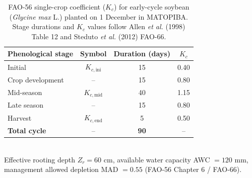 \begin{table}[!ht]
\centering
\caption{FAO-56 single-crop coefficient (\(K_c\)) for early-cycle soybean
(\textit{Glycine max} L.) planted on 1 December in MATOPIBA. Stage durations
and \(K_c\) values follow Allen \textit{et al.} (1998) Table 12 and Steduto
\textit{et al.} (2012) FAO-66.}
\label{tab:kc_soybean}
\begin{tabular}{lccc}
\toprule
\textbf{Phenological stage} & \textbf{Symbol} & \textbf{Duration (days)} & \textbf{\(K_c\)} \\
\midrule
Initial          & \(K_{c,\text{ini}}\) & 15 & 0.40 \\
Crop development & --                   & 15 & 0.80 \\
Mid-season       & \(K_{c,\text{mid}}\) & 40 & 1.15 \\
Late season      & --                   & 15 & 0.80 \\
Harvest          & \(K_{c,\text{end}}\) &  5 & 0.50 \\
\midrule
\textbf{Total cycle} & -- & \textbf{90} & -- \\
\bottomrule
\end{tabular}
\vspace{0.4em}\\
\footnotesize{Effective rooting depth \(Z_r = 60\) cm, available water
capacity AWC \(= 120\) mm, management allowed depletion MAD \(= 0.55\)
(FAO-56 Chapter 6 / FAO-66).}
\end{table}

